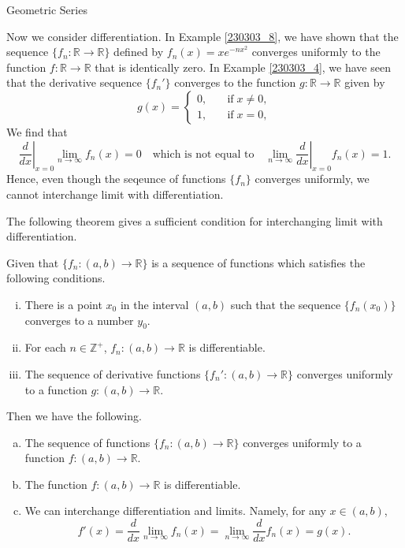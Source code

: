 \begin{example}[label=230305_16]{Geometric Series}
\begin{example}[label=230304_9]{}
Now we consider differentiation. In Example \ref{230303_8}, we have shown that the sequence $\{f_n:\mathbb{R}\to\mathbb{R}\}$ defined by $f_n(x)=xe^{-nx^2}$ converges uniformly to the function $f:\mathbb{R}\to\mathbb{R}$ that is identically zero. In Example \ref{230303_4}, we have seen that the derivative sequence $\{f_n'\}$ converges to the function $g:\mathbb{R}\to\mathbb{R}$ given  by
\[g(x)=\begin{cases}0,\quad &\text{if}\;x\neq 0,\\1,\quad &\text{if}\; x=0,\end{cases}\]We  find that
\[\left.\frac{d}{dx} \right|_{x=0}\lim_{n\to\infty} f_n(x)=0 \quad\text{which is not equal to}\quad\lim_{n\to\infty} \left.\frac{d}{dx} \right|_{x=0}f_n(x)=1.\]
Hence, even though the seqeunce of functions $\{f_n\}$ converges uniformly, we cannot interchange limit with differentiation.

 The following theorem gives a sufficient condition for interchanging limit with differentiation.



 
\begin{theorem}[label=230304_8]{}
Given that   $\{f_n:(a,b)\to\mathbb{R}\}$ is a sequence of   functions which satisfies the following conditions.
\begin{enumerate}[(i)]
\item There is a point $x_0$ in the interval $(a,b)$ such that the sequence   $\{f_n(x_0)\}$ converges to a number   $y_0$.
\item For each $n\in\mathbb{Z}^+$, $f_n:(a,b)\to\mathbb{R}$ is   differentiable.
\item The sequence of derivative functions $\{f_n':(a,b)\to\mathbb{R}\}$ converges uniformly to a function $g:(a,b)\to\mathbb{R}$.

\end{enumerate}
Then we have the following.
\begin{enumerate}[(a)]
\item The sequence of functions $\{f_n:(a,b)\to\mathbb{R}\}$ converges uniformly to a function $f:(a,b)\to\mathbb{R}$.
\item The function $f:(a,b)\to\mathbb{R}$ is differentiable.
\item  We can interchange differentiation and limits. Namely, for any $x\in (a,b)$, \[f'(x)= \frac{d}{dx}\lim_{n\to\infty}f_n(x)=\lim_{n\to\infty}\frac{d}{dx}f_n(x)= g(x).\]
\end{enumerate}
\end{theorem}
 


\end{example}
\end{example}
